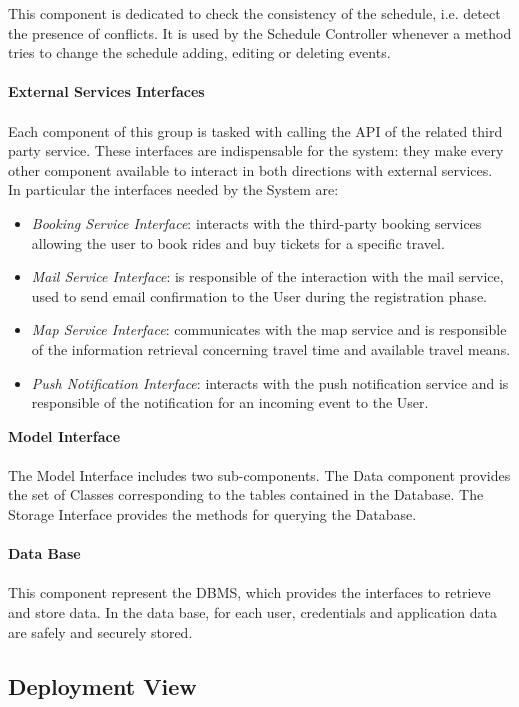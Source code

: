 This component is dedicated to check the consistency of the schedule, i.e. detect the presence of conflicts. It is used by the Schedule Controller whenever a method tries to change the schedule adding, editing or deleting events.
\\ \\
\textbf{External Services Interfaces}
\\ \\
Each component of this group is tasked with calling the API of the related third party service. These interfaces are indispensable for the system: they make every other component available to interact in both directions with external services.\\
In particular the interfaces needed by the System are:
\begin{itemize}
	\item  \textit{Booking Service Interface}: interacts with the third-party booking services allowing the user to book rides and buy tickets for a specific travel.
	\item \textit{Mail Service Interface}: is responsible of the interaction with the mail service, used to send email confirmation to the User during the registration phase.
	\item  \textit{Map Service Interface}: communicates with the map service and is responsible of the information retrieval concerning travel time and available travel means.
	\item \textit{Push Notification Interface}: interacts with the push notification service and is responsible of the notification for an incoming event to the User.
\end{itemize}
\noindent
\textbf{Model Interface}
\\ \\
The Model Interface includes two sub-components. The Data component provides the set of Classes corresponding to the tables contained in the Database. The Storage Interface provides the methods for querying the Database.
\\ \\
\textbf{Data Base}
\\ \\
This component represent the DBMS, which provides the interfaces to retrieve and store data. In the data base, for each user, credentials and application data are safely and securely stored.

\subsection{Deployment View}


